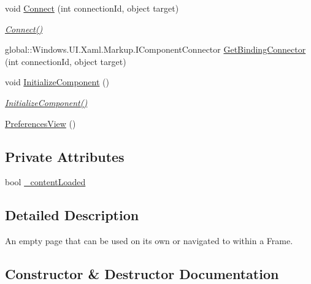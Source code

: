 \begin{DoxyCompactItemize}
void \hyperlink{class_eli_log_in_app_1_1_preferences_view_a979b48f7f808413a31c72a11ae2918c8}{Connect} (int connection\+Id, object target)
\begin{DoxyCompactList}\small\item\em \hyperlink{class_eli_log_in_app_1_1_preferences_view_a979b48f7f808413a31c72a11ae2918c8}{Connect()} \end{DoxyCompactList}\item 
global\+::\+Windows.\+U\+I.\+Xaml.\+Markup.\+I\+Component\+Connector \hyperlink{class_eli_log_in_app_1_1_preferences_view_a6273030198e76482848eb8950537747a}{Get\+Binding\+Connector} (int connection\+Id, object target)
\item 
void \hyperlink{class_eli_log_in_app_1_1_preferences_view_af98b701b0ba520a7e3c258e1f54fd8bc}{Initialize\+Component} ()
\begin{DoxyCompactList}\small\item\em \hyperlink{class_eli_log_in_app_1_1_preferences_view_af98b701b0ba520a7e3c258e1f54fd8bc}{Initialize\+Component()} \end{DoxyCompactList}\item 
\hyperlink{class_eli_log_in_app_1_1_preferences_view_aefa66b556028089da03c21e20b0b6374}{Preferences\+View} ()
\end{DoxyCompactItemize}
\subsection*{Private Attributes}
\begin{DoxyCompactItemize}
\item 
bool \hyperlink{class_eli_log_in_app_1_1_preferences_view_a606f681d90089275f3bcef1a6651c5ae}{\+\_\+content\+Loaded}
\end{DoxyCompactItemize}


\subsection{Detailed Description}
An empty page that can be used on its own or navigated to within a Frame. 



\subsection{Constructor \& Destructor Documentation}
\mbox{\label{class_eli_log_in_app_1_1_preferences_view_aefa66b556028089da03c21e20b0b6374}} 
